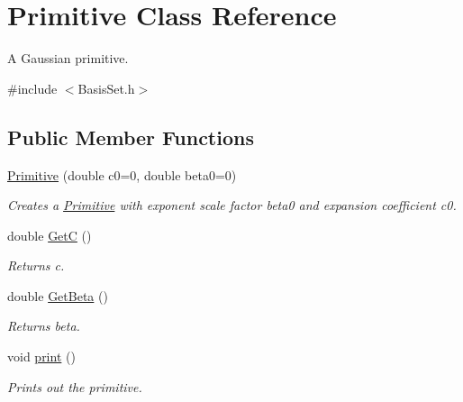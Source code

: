 \hypertarget{classJKBuilder_1_1Primitive}{
\section{Primitive Class Reference}
\label{classJKBuilder_1_1Primitive}
}


A Gaussian primitive.  


{\ttfamily \#include $<$BasisSet.h$>$}\subsection*{Public Member Functions}
\begin{DoxyCompactItemize}
\item 
\hyperlink{classJKBuilder_1_1Primitive_ad5c80a16eab14367b76a4dc79844d0d5}{Primitive} (double c0=0, double beta0=0)
\begin{DoxyCompactList}\small\item\em Creates a \hyperlink{classJKBuilder_1_1Primitive}{Primitive} with exponent scale factor beta0 and expansion coefficient c0. \item\end{DoxyCompactList}\item 
double \hyperlink{classJKBuilder_1_1Primitive_a229a18fdc499aafe149c55011f9fb2fb}{GetC} ()
\begin{DoxyCompactList}\small\item\em Returns c. \item\end{DoxyCompactList}\item 
double \hyperlink{classJKBuilder_1_1Primitive_a8b788f95c3fa1f2cc9aedaa1b92b78a1}{GetBeta} ()
\begin{DoxyCompactList}\small\item\em Returns beta. \item\end{DoxyCompactList}\item 
void \hyperlink{classJKBuilder_1_1Primitive_a388f572c62279f839ee138a9afbdeeb5}{print} ()
\begin{DoxyCompactList}\small\item\em Prints out the primitive. \item\end{DoxyCompactList}\end{DoxyCompactItemize}
